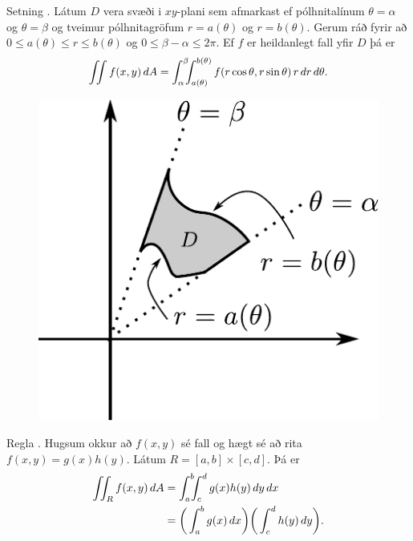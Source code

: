 \begin{frame}{} 

\begin {block}{Setning \kaflanr.}
Látum $D$ vera svæði i $xy$-plani sem
afmarkast ef pólhnitalínum $\theta=\alpha$ og $\theta=\beta$ og
tveimur pólhnitagröfum $r=a(\theta)$ og $r=b(\theta)$.  Gerum ráð
fyrir að $0\leq a(\theta)\leq
r\leq b(\theta)$ og $0\leq \beta-\alpha\leq 2\pi$.
Ef $f$ er heildanlegt fall yfir $D$
þá er 
$$\int\!\!\!\int f(x,y)\,dA=\int_\alpha^\beta\!\!\!\int_{a(\theta)}^{b(\theta)}
f(r\cos\theta,r\sin\theta)\,r\,dr\, d\theta.$$

\end{block}
\begin {figure}[h!]
 \centering
            \includegraphics[width=0.35\linewidth]{polarsvaedi}
\end {figure}
\end{frame}


\begin{frame}{} 

\begin {block}{Regla \kaflanr.}
Hugsum okkur að $f(x,y)$ sé fall og hægt sé að rita
$f(x,y)=g(x)h(y)$.  Látum $R=[a,b]\times [c,d]$.  Þá er 
\begin{align*}
\int\!\!\!\int_R f(x,y)\,dA&=\int_a^b\!\!\!\int_{c}^{d}g(x)h(y)\,dy\, dx\\
&=\bigg(\int_a^b g(x)\,dx\bigg)\bigg(\int_c^d h(y)\,dy\bigg).
\end{align*}
\end{block}

\end{frame}


